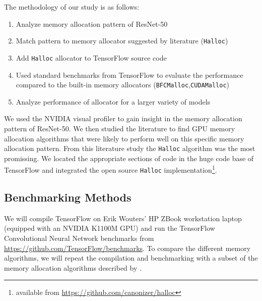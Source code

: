\documentclass[12pt,twoside]{article}
\begin{document}
The methodology of our study is as follows:
\begin{enumerate}
\vspace{-5px}
\itemsep-0.25em
    \item Analyze memory allocation pattern of ResNet-50
    \item Match pattern to memory allocator suggested by literature (\texttt{Halloc})
    \item Add \texttt{Halloc} allocator to TensorFlow source code
    \item Used standard benchmarks from TensorFlow to evaluate the performance compared to the built-in memory allocators (\texttt{BFCMalloc},\texttt{CUDAMalloc})
    \item Analyze performance of allocator for a larger variety of models
\vspace{-5px}
\end{enumerate}

We used the NVIDIA visual profiler to gain insight in the memory allocation pattern of ResNet-50. We then studied the literature to find GPU memory allocation algorithms that were likely to perform well on this specific memory allocation pattern. From this literature study the \texttt{Halloc} algorithm was the most promissing. We located the appropriate sections of code in the huge code base of TensorFlow and integrated the open source \texttt{Halloc} implementation\footnote{available from \url{https://github.com/canonizer/halloc}}.






\subsection*{Benchmarking Methods}

We will compile TensorFlow on Erik Wouters' HP ZBook workstation laptop (equipped with an NVIDIA K1100M GPU) and run the TensorFlow Convolutional Neural Network benchmarks from \url{https://github.com/TensorFlow/benchmarks}. To compare the different memory algorithms, we will repeat the compilation and benchmarking with a subset of the memory allocation algorithms described by \citeauthor{Vinkler2015} \cite{Vinkler2015}.
\end{document}
